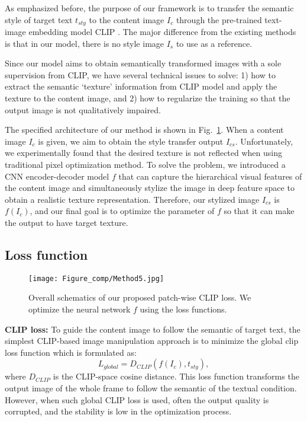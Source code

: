 \documentclass[10pt,twocolumn,letterpaper]{article}
\begin{document}
As emphasized before, the purpose of our framework is to transfer the semantic style of target text $t_{sty}$ to the content image $I_c$ through the pre-trained text-image embedding model CLIP \cite{clip}. The major difference from the existing methods is that in our model, there is no style image $I_s$ to use as a reference.

Since our model aims to obtain semantically transformed images with a sole supervision from CLIP, we have several technical issues to solve: 1) how to extract the semantic `texture' information from CLIP model and apply the texture to the content image, and 2) how to regularize the training so that the output image is not qualitatively impaired. 

The specified architecture of our method is shown in Fig.~\ref{fig:method}. When a content image $I_c$ is given, we aim to obtain the style transfer output $I_{cs}$.  Unfortunately, we experimentally found that the desired texture is not reflected when using traditional pixel optimization method.
To solve the problem, we introduced a CNN encoder-decoder model $f$ that can capture the hierarchical visual features of the content image and simultaneously stylize the image in deep feature space to obtain a realistic texture representation. Therefore, our stylized image $I_{cs}$ is $f(I_c)$, and our final goal is to optimize the parameter of $f$ so that it can make the output to have target texture. 

\subsection{Loss function}

\begin{figure}[!t]
\centering
\vspace*{-0.5cm}
\texttt{[image: Figure\_comp/Method5.jpg]}
\vspace*{-0.5cm}
\caption{Overall schematics of our proposed patch-wise CLIP loss. We optimize the neural network  $f$ using the loss functions. 
}
\label{fig:method}
\end{figure}

\noindent \textbf{CLIP loss:} To guide the content image to follow the semantic of target text, the simplest CLIP-based image manipulation approach\cite{styleclip} is to minimize the global clip loss function which is formulated as:
\begin{equation}
     L_{global} = D_{CLIP}(f(I_c),t_{sty}),
\end{equation}
where $D_{CLIP}$ is the CLIP-space cosine distance. This loss function transforms the output image of the whole frame to follow the semantic of the textual condition. However, when such  global CLIP loss is used, often the output quality is corrupted, and the stability is low in the optimization process. 
\end{document}
